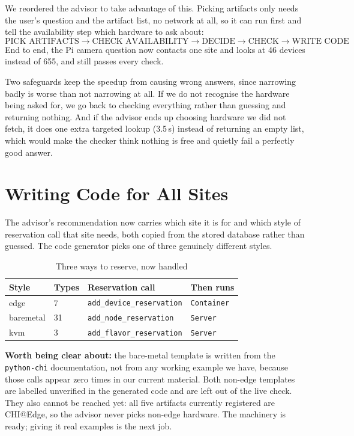 \documentclass[conference]{IEEEtran}
\begin{document}
We reordered the advisor to take advantage of this. Picking artifacts only
needs the user's question and the artifact list, no network at all, so it can
run first and tell the availability step which hardware to ask about:
\[
\text{PICK ARTIFACTS} \rightarrow \text{CHECK AVAILABILITY} \rightarrow
\text{DECIDE} \rightarrow \text{CHECK} \rightarrow \text{WRITE CODE}
\]
End to end, the Pi camera question now contacts one site and looks at 46
devices instead of 655, and still passes every check.

Two safeguards keep the speedup from causing wrong answers, since narrowing
badly is worse than not narrowing at all. If we do not recognise the hardware
being asked for, we go back to checking everything rather than guessing and
returning nothing. And if the advisor ends up choosing hardware we did not
fetch, it does one extra targeted lookup (3.5\,s) instead of returning an empty
list, which would make the checker think nothing is free and quietly fail a
perfectly good answer.

\section{Writing Code for All Sites}

The advisor's recommendation now carries which site it is for and which style
of reservation call that site needs, both copied from the stored database
rather than guessed. The code generator picks one of three genuinely different
styles.

\begin{table}[h]
\caption{Three ways to reserve, now handled}
\label{tab:emit}
\centering\footnotesize
\begin{tabular}{@{}llll@{}}
\toprule
Style & Types & Reservation call & Then runs \\
\midrule
edge      & 7  & \texttt{add\_device\_reservation} & \texttt{Container} \\
baremetal & 31 & \texttt{add\_node\_reservation}   & \texttt{Server} \\
kvm       & 3  & \texttt{add\_flavor\_reservation} & \texttt{Server} \\
\bottomrule
\end{tabular}
\end{table}

\textbf{Worth being clear about:} the bare-metal template is written from the
\texttt{python-chi} documentation, not from any working example we have,
because those calls appear zero times in our current material. Both non-edge
templates are labelled unverified in the generated code and are left out of the
live check. They also cannot be reached yet: all five artifacts currently
registered are CHI@Edge, so the advisor never picks non-edge hardware. The
machinery is ready; giving it real examples is the next job.
\end{document}
